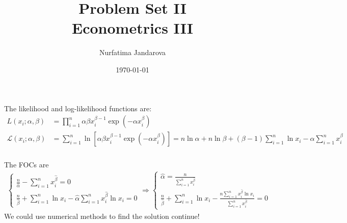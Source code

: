 \documentclass[]{article}
\title{Problem Set II \\ \large Econometrics III}
\author{Nurfatima Jandarova}
\date{\today}
\begin{document}
\maketitle

\subsection{}
\subsubsection{}
The likelihood and log-likelihood functions are:
\begin{equation}
	\begin{split}
		L(x_i; \alpha, \beta)& = \prod\limits_{i = 1}^{n}\alpha\beta x_i^{\beta - 1}\exp(-\alpha x_i^\beta) \\ \nonumber
		\mathcal{L}(x_i; \alpha, \beta)& = \sum\limits_{i = 1}^n\ln\left[\alpha\beta x_i^{\beta - 1}\exp(-\alpha x_i^\beta)\right] = n\ln\alpha + n\ln\beta + (\beta - 1)\sum\limits_{i = 1}^n\ln x_i - \alpha\sum\limits_{i = 1}^n x_i^\beta
	\end{split}
\end{equation}

\subsubsection{}
The FOCs are
\begin{equation}
	\begin{split}
		\begin{cases}
			\frac{n}{\hat{\alpha}} - \sum\limits_{i = 1}^n x_i^{\hat{\beta}} = 0 \\
			\frac{n}{\hat{\beta}} + \sum\limits_{i = 1}^n\ln x_i - \hat{\alpha}\sum\limits_{i = 1}^n x_i^{\hat{\beta}}\ln x_i = 0
		\end{cases} \Rightarrow \begin{cases}
			\hat{\alpha} = \frac{n}{\sum\limits_{i = 1}^n x_i^{\hat{\beta}}} \\
			\frac{n}{\hat{\beta}} + \sum\limits_{i = 1}^n\ln x_i - \frac{n\sum\limits_{i = 1}^n x_i^{\hat{\beta}}\ln x_i}{\sum\limits_{i = 1}^n x_i^{\hat{\beta}}} = 0
		\end{cases}\nonumber
	\end{split}
\end{equation}
We could use numerical methods to find the solution {\Huge continue!}
\end{document}
